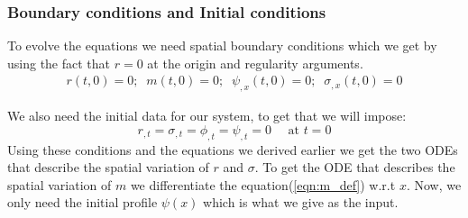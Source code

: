 \documentclass[hyperref={bookmarks=false},aspectratio=169]{beamer}
\begin{document}



\begin{frame}
    \frametitle{Boundary conditions and Initial conditions}
    To evolve the equations we need spatial boundary conditions which we get by using the fact that $r=0$ at the origin and regularity arguments.
    \begin{eqnarray*}
        r(t,0) = 0 ;\;\; m(t,0) =0 ;\;\; \psi_{,x}(t,0) = 0 ;\;\; \sigma_{,x}(t,0) = 0
    \end{eqnarray*}

    We also need the initial data for our system, to get that we will impose:
    \begin{equation*}
        r_{, t}=\sigma_{, t}=\phi_{, t}=\psi_{, t}=0 \quad \text { at } t=0
        \label{eqn:time_symmetric_boundary_conditinons}
    \end{equation*}
    Using these conditions and the equations we derived earlier we get the two ODEs that describe the spatial variation of $r$ and $\sigma$. To get the ODE that describes the spatial variation of $m$ we differentiate the equation(\ref{eqn:m_def}) w.r.t $x$. Now, we only need the initial profile $\psi(x)$ which is what we give as the input.
\end{frame}
\end{document}
